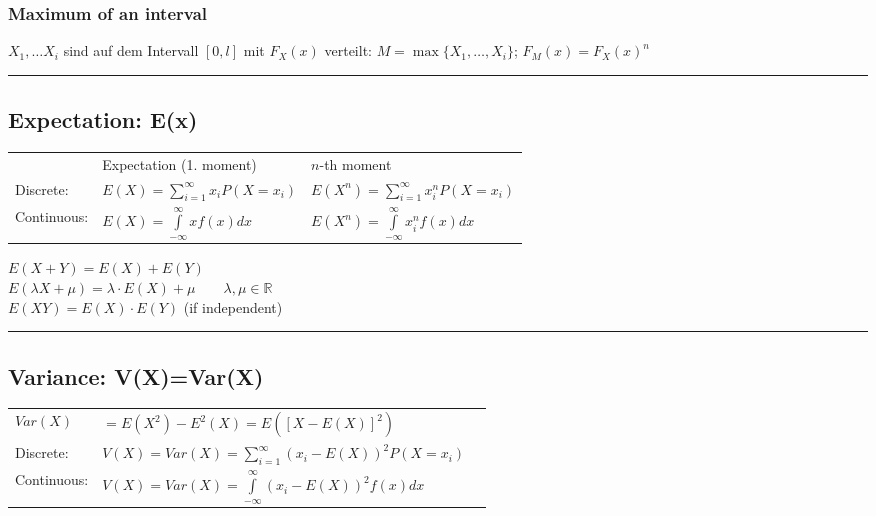 		\subsubsection{Maximum of an interval}
		$X_1,\ldots X_i$ sind auf dem Intervall $[0,l]$ mit $F_X(x)$ verteilt: $M=\max \{ X_1,\ldots,X_i\} $; $F_M(x)=F_X(x)^n$
\vspace{2mm}
\hrule
\vspace{3mm}

\subsection{Expectation: E(x) }
\begin{minipage}{12cm}
  \begin{tabular}{p{2cm}p{4cm}p{5cm} }
  			&  Expectation (1. moment)						&	$n$-th moment	\\
  Discrete:	 &$E(X)=\sum\limits_{i=1}^\infty{x_i P(X=x_i)}$	&	$E(X^n)=\sum\limits_{i=1}^\infty{x_i^n P(X=x_i)}$\\
  Continuous:  &$E(X)=\int\limits_{-\infty}^\infty{x f(x)dx}$	&	$E(X^n)=\int\limits_{-\infty}^\infty{x_i^n f(x)dx}$\\
  \end{tabular}
\end{minipage}
\begin{minipage}{7cm}
  $E(X+Y)=E(X)+E(Y)$\\
  $E(\lambda X + \mu)=\lambda \cdot E(X) + \mu \qquad\lambda, \mu \in \mathbb{R}$\\
  $E(XY) = E(X)\cdot E(Y)$ (if independent)\\
\end{minipage}

\vspace{2mm}
\hrule
\vspace{3mm}

\subsection{Variance: V(X)=Var(X) }
  \begin{tabular}{p{2cm}p{8cm}l}
  	$Var(X)$	&	$=E(X^2)-E^2(X)=E\left([X-E(X)]^2\right)$						& \\
  	Discrete: 	&	$V(X)=Var(X)=\sum\limits_{i=1}^\infty{(x_i-E(X))^2 P(X=x_i)}$	& \\
  	Continuous: &	$V(X)=Var(X)=\int\limits_{-\infty}^\infty{(x_i-E(X))^2 f(x)dx}$	& \\
  \end{tabular}

